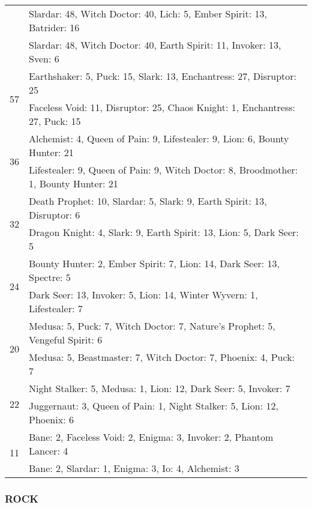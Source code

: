 \documentclass[result.tex]{subfiles}
\begin{document}
\begin{table}[H]
\begin{tabular}{ | c | p{12.5cm} | }
    & Slardar: 48, Witch Doctor: 40, Lich: 5, Ember Spirit: 13, Batrider: 16 \\
    & Slardar: 48, Witch Doctor: 40, Earth Spirit: 11, Invoker: 13, Sven: 6 \\
    \hline
    \multirow{2}{*}{57}
    & Earthshaker: 5, Puck: 15, Slark: 13, Enchantress: 27, Disruptor: 25 \\
    & Faceless Void: 11, Disruptor: 25, Chaos Knight: 1, Enchantress: 27, Puck: 15 \\
    \hline
    \multirow{2}{*}{36}
    & Alchemist: 4, Queen of Pain: 9, Lifestealer: 9, Lion: 6, Bounty Hunter: 21 \\
    & Lifestealer: 9, Queen of Pain: 9, Witch Doctor: 8, Broodmother: 1, Bounty Hunter: 21 \\
    \hline
    \multirow{2}{*}{32}
    & Death Prophet: 10, Slardar: 5, Slark: 9, Earth Spirit: 13, Disruptor: 6 \\
    & Dragon Knight: 4, Slark: 9, Earth Spirit: 13, Lion: 5, Dark Seer: 5 \\
    \hline
    \multirow{2}{*}{24}
    & Bounty Hunter: 2, Ember Spirit: 7, Lion: 14, Dark Seer: 13, Spectre: 5 \\
    & Dark Seer: 13, Invoker: 5, Lion: 14, Winter Wyvern: 1, Lifestealer: 7 \\
    \hline
    \multirow{2}{*}{20}
    & Medusa: 5, Puck: 7, Witch Doctor: 7, Nature's Prophet: 5, Vengeful Spirit: 6 \\
    & Medusa: 5, Beastmaster: 7, Witch Doctor: 7, Phoenix: 4, Puck: 7 \\
    \hline
    \multirow{2}{*}{22}
    & Night Stalker: 5, Medusa: 1, Lion: 12, Dark Seer: 5, Invoker: 7 \\
    & Juggernaut: 3, Queen of Pain: 1, Night Stalker: 5, Lion: 12, Phoenix: 6 \\
    \hline
    \multirow{2}{*}{11}
    & Bane: 2, Faceless Void: 2, Enigma: 3, Invoker: 2, Phantom Lancer: 4 \\
    & Bane: 2, Slardar: 1, Enigma: 3, Io: 4, Alchemist: 3 \\
    \hline
  \end{tabular}
  \caption{}
  \label{}
\end{table}

\newpage

\subsubsection*{ROCK}
\end{document}
